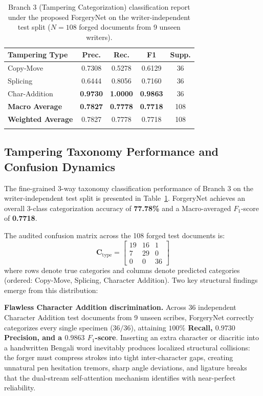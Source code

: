 \documentclass[pdflatex,sn-mathphys-num,iicol]{sn-jnl}
\begin{document}
\begin{table}[t]
\caption{Branch 3 (Tampering Categorization) classification report under the proposed ForgeryNet on the writer-independent test split ($N = 108$ forged documents from 9 unseen writers).}\label{tab_type}
\setlength{\tabcolsep}{2.5pt}
\begin{tabular*}{\columnwidth}{@{\extracolsep\fill}lcccc@{}}
\toprule
\textbf{Tampering Type} & \textbf{Prec.} & \textbf{Rec.} & \textbf{F1} & \textbf{Supp.} \\
\midrule
Copy-Move           & 0.7308 & 0.5278 & 0.6129 & 36 \\
Splicing            & 0.6444 & 0.8056 & 0.7160 & 36 \\
Char-Addition       & \textbf{0.9730} & \textbf{1.0000} & \textbf{0.9863} & 36 \\
\midrule
\textbf{Macro Average}      & \textbf{0.7827} & \textbf{0.7778} & \textbf{0.7718} & 108 \\
\textbf{Weighted Average}   & 0.7827 & 0.7778 & 0.7718 & 108 \\
\botrule
\end{tabular*}
\end{table}

\subsection{Tampering Taxonomy Performance and Confusion Dynamics}\label{subsec5_4}
The fine-grained 3-way taxonomy classification performance of Branch 3 on the writer-independent test split is presented in Table~\ref{tab_type}. ForgeryNet achieves an overall 3-class categorization accuracy of \textbf{77.78\%} and a Macro-averaged $F_1$-score of \textbf{0.7718}. 

\noindent
The audited confusion matrix across the 108 forged test documents is:
\begin{equation}
\mathbf{C}_{\text{type}} = \begin{bmatrix}
19 & 16 & 1 \\
7 & 29 & 0 \\
0 & 0 & 36
\end{bmatrix}\label{eq_confusion}
\end{equation}
where rows denote true categories and columns denote predicted categories (ordered: Copy-Move, Splicing, Character Addition). Two key structural findings emerge from this distribution:

\noindent
\textbf{Flawless Character Addition discrimination.} Across 36 independent Character Addition test documents from 9 unseen scribes, ForgeryNet correctly categorizes every single specimen ($36/36$), attaining \textbf{$100\%$ Recall, $0.9730$ Precision, and a $0.9863$ $F_1$-score}. Inserting an extra character or diacritic into a handwritten Bengali word inevitably produces localized structural collisions: the forger must compress strokes into tight inter-character gaps, creating unnatural pen hesitation tremors, sharp angle deviations, and ligature breaks that the dual-stream self-attention mechanism identifies with near-perfect reliability.
\end{document}
